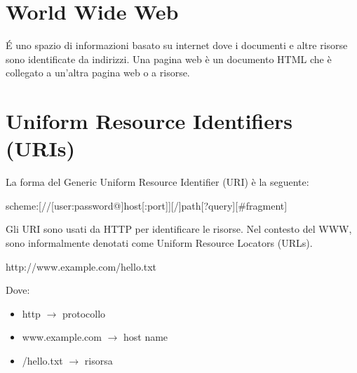 \section{World Wide Web}
\'E uno spazio di informazioni basato su internet dove i documenti e altre risorse sono identificate da indirizzi. Una pagina web è un documento HTML che è collegato a un'altra pagina web o a risorse.

\section{Uniform Resource Identifiers (URIs)}
La forma del Generic Uniform Resource Identifier (URI) è la seguente:
\begin{center}
    scheme:[//[user:password@]host[:port]][/]path[?query][\#fragment]
\end{center}
Gli URI sono usati da HTTP per identificare le risorse. Nel contesto del WWW, sono informalmente denotati come Uniform Resource Locators (URLs).
\begin{center}
    http://www.example.com/hello.txt
\end{center}
Dove:
\begin{itemize}
    \item http $\rightarrow$ protocollo
    \item www.example.com $\rightarrow$ host name
    \item /hello.txt $\rightarrow$ risorsa
\end{itemize}

